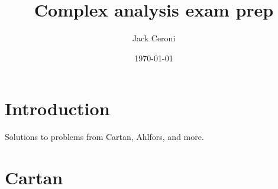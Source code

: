\documentclass[aps,pra,showpacs,notitlepage,onecolumn,superscriptaddress,nofootinbib]{revtex4-1}
\theoremstyle{definition}
\newcommand{\hhrulefill}{\hspace{-1.5em} \hrulefill}
\begin{document}
\title{Complex analysis exam prep}
\author{Jack Ceroni}

\date{\today}

\maketitle

\tableofcontents

\section{Introduction}

\noindent Solutions to problems from Cartan, Ahlfors, and more.

\section{Cartan}

\hhrulefill
\end{document}
